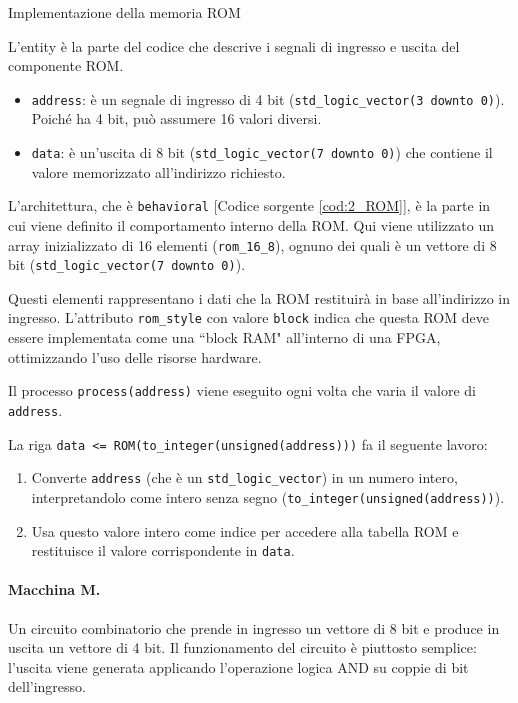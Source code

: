\begin{code}
    \inputminted{vhdl}{vhdl/2_ROM.vhd}
    \caption{Implementazione della memoria ROM}
    \label{cod:2_ROM}
\end{code}

L'entity è la parte del codice che descrive i segnali di ingresso e uscita del componente ROM.

\begin{itemize}
    \item \texttt{address}: è un segnale di ingresso di 4 bit (\texttt{std\_logic\_vector(3 downto 0)}). Poiché ha 4 bit, può assumere 16 valori diversi.
    \item \texttt{data}: è un'uscita di 8 bit (\texttt{std\_logic\_vector(7 downto 0)}) che contiene il valore memorizzato all'indirizzo richiesto.
\end{itemize}

L'architettura, che è \texttt{behavioral} [Codice sorgente \ref{cod:2_ROM}], è la parte in cui viene definito il comportamento interno della ROM. Qui viene utilizzato un array inizializzato di 16 elementi (\texttt{rom\_16\_8}), ognuno dei quali è un vettore di 8 bit (\texttt{std\_logic\_vector(7 downto 0)}). 

Questi elementi rappresentano i dati che la ROM restituirà in base all'indirizzo in ingresso. L'attributo \texttt{rom\_style} con valore \texttt{block} indica che questa ROM deve essere implementata come una ``block RAM" all'interno di una FPGA, ottimizzando l'uso delle risorse hardware.

Il processo \texttt{process(address)} viene eseguito ogni volta che varia il valore di \texttt{address}.

La riga \texttt{data <= ROM(to\_integer(unsigned(address)))} fa il seguente lavoro:
\begin{enumerate}
    \item Converte \texttt{address} (che è un \texttt{std\_logic\_vector}) in un numero intero, interpretandolo come intero senza segno (\texttt{to\_integer(unsigned(address))}).
    \item Usa questo valore intero come indice per accedere alla tabella ROM e restituisce il valore corrispondente in \texttt{data}.
\end{enumerate}

\paragraph{Macchina M.} Un circuito combinatorio che prende in ingresso un vettore di 8 bit e produce in uscita un vettore di 4 bit. Il funzionamento del circuito è piuttosto semplice: l'uscita viene generata applicando l'operazione logica AND su coppie di bit dell'ingresso.

